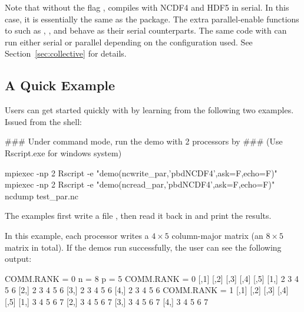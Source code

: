 Note that without the flag
,
 compiles with NCDF4 and HDF5 in serial.  In this case, it is essentially the same as the  package.
The extra parallel-enable  functions to 
such as ,
, and  behave as their serial counterparts.
The same  code with 
can run either serial or parallel depending on the configuration used.
See Section~\ref{sec:collective} for details.


\subsection[A Quick Example]{A Quick Example}
\label{sec:quick_example}

Users can get started quickly with  by learning from the following two examples.  Issued from the shell:
\begin{Command}
### Under command mode, run the demo with 2 processors by
### (Use Rscript.exe for windows system)

mpiexec -np 2 Rscript -e "demo(ncwrite_par,'pbdNCDF4',ask=F,echo=F)"
mpiexec -np 2 Rscript -e "demo(ncread_par,'pbdNCDF4',ask=F,echo=F)"
ncdump test_par.nc
\end{Command}
The examples first write a file , then read it back in and print the results.

In this example, each processor writes a $4\times 5$ column-major matrix (an $8\times 5$ matrix in total).  If the demos run successfully, the user can see the following output:
\begin{CodeOutput}[title=Output of \code{ncread}]
COMM.RANK = 0
n = 8 p = 5
COMM.RANK = 0
     [,1] [,2] [,3] [,4] [,5]
[1,]    2    3    4    5    6
[2,]    2    3    4    5    6
[3,]    2    3    4    5    6
[4,]    2    3    4    5    6
COMM.RANK = 1
     [,1] [,2] [,3] [,4] [,5]
[1,]    3    4    5    6    7
[2,]    3    4    5    6    7
[3,]    3    4    5    6    7
[4,]    3    4    5    6    7
\end{CodeOutput}

